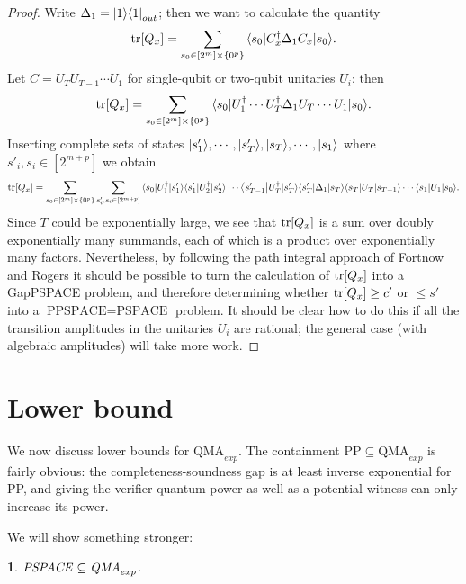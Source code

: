 \documentclass[english]{article}
\numberwithin{equation}{section}
\numberwithin{figure}{section}
\theoremstyle{plain}
\newtheorem{thm}{\protect\theoremname}
\theoremstyle{definition}
\theoremstyle{plain}
\theoremstyle{definition}
\theoremstyle{remark}
\theoremstyle{remark}
\theoremstyle{plain}
\providecommand{\theoremname}{Theorem}
\begin{document}
\begin{proof}
Write $\Delta_1 = {\left\vert{1}\right\rangle}{\left\langle{1}\right\vert}_{out}$; then we want to calculate the quantity
\begin{equation}
\operatorname{tr}[Q_x] = \sum_{s_0 \in [2^m] \times \{0^p\}} {\left\langle{s_0}\right\vert} C^\dagger_x \Delta_1 C_x {\left\vert{s_0}\right\rangle}.
\end{equation}
Let $C = U_TU_{T-1}\cdots U_1$ for single-qubit or two-qubit unitaries $U_i$; then
\begin{equation}
\operatorname{tr}[Q_x] = \sum_{s_0 \in [2^m] \times \{0^p\}} {\left\langle{s_0}\right\vert} U_1^\dagger \cdots U_T^\dagger \Delta_1 U_T\cdots U_1 {\left\vert{s_0}\right\rangle}.
\end{equation}
Inserting complete sets of states ${\left\vert{s'_1}\right\rangle},\cdots,{\left\vert{s'_T}\right\rangle},{\left\vert{s_T}\right\rangle},\cdots,{\left\vert{s_1}\right\rangle}$ where $s'_i,s_i \in [2^{m+p}]$ we obtain
\begin{equation}
\operatorname{tr}[Q_x] = \sum_{s_0 \in [2^m] \times \{0^p\}} \sum_{s'_i,s_i \in [2^{m+p}]} {\left\langle{s_0}\right\vert} U_1^\dagger {\left\vert{s'_1}\right\rangle}{\left\langle{s'_1}\right\vert}U_2^\dagger{\left\vert{s'_2}\right\rangle} \cdots {\left\langle{s'_{T-1}}\right\vert}U_T^\dagger{\left\vert{s'_T}\right\rangle} {\left\langle{s'_T}\right\vert}\Delta_1 {\left\vert{s_T}\right\rangle}{\left\langle{s_T}\right\vert}U_T{\left\vert{s_{T-1}}\right\rangle}\cdots {\left\langle{s_1}\right\vert}U_1 {\left\vert{s_0}\right\rangle}.
\end{equation}
Since $T$ could be exponentially large, we see that $\operatorname{tr}[Q_x]$ is a sum over doubly exponentially many summands, each of which is a product over exponentially many factors. Nevertheless, by following the path integral approach of Fortnow and Rogers it should be possible to turn the calculation of $\operatorname{tr}[Q_x]$ into a GapPSPACE problem, and therefore determining whether $\operatorname{tr}[Q_x] \ge c'$ or $\le s'$ into a $\text{PPSPACE} = \text{PSPACE}$ problem. It should be clear how to do this if all the transition amplitudes in the unitaries $U_i$ are rational; the general case (with algebraic amplitudes) will take more work.

\end{proof}

\section{Lower bound}
We now discuss lower bounds for $\text{QMA}_{exp}$. The containment $\text{PP}\subseteq \text{QMA}_{exp}$ is fairly obvious: the completeness-soundness gap is at least inverse exponential for PP, and giving the verifier quantum power as well as a potential witness can only increase its power.

We will show something stronger:
\begin{thm}
$ \text{\emph{PSPACE}} \subseteq \text{\emph{QMA}}_{exp}$.
\end{thm}
\end{document}
